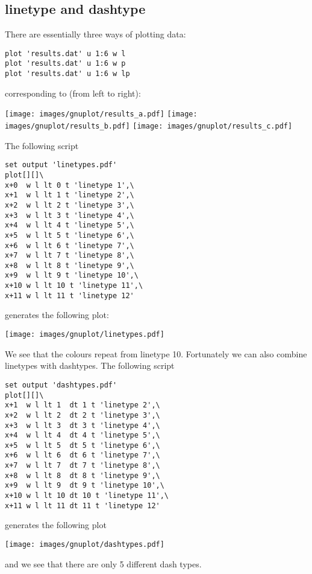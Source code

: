 \subsection*{linetype and dashtype}

There are essentially three ways of plotting data: 
\begin{verbatim}
plot 'results.dat' u 1:6 w l 
plot 'results.dat' u 1:6 w p
plot 'results.dat' u 1:6 w lp
\end{verbatim}
corresponding to (from left to right):
\begin{center}
\texttt{[image: images/gnuplot/results\_a.pdf]}
\texttt{[image: images/gnuplot/results\_b.pdf]}
\texttt{[image: images/gnuplot/results\_c.pdf]}
\end{center}

The following script
\begin{verbatim}
set output 'linetypes.pdf'
plot[][]\
x+0  w l lt 0 t 'linetype 1',\
x+1  w l lt 1 t 'linetype 2',\
x+2  w l lt 2 t 'linetype 3',\
x+3  w l lt 3 t 'linetype 4',\
x+4  w l lt 4 t 'linetype 5',\
x+5  w l lt 5 t 'linetype 6',\
x+6  w l lt 6 t 'linetype 7',\
x+7  w l lt 7 t 'linetype 8',\
x+8  w l lt 8 t 'linetype 9',\
x+9  w l lt 9 t 'linetype 10',\
x+10 w l lt 10 t 'linetype 11',\
x+11 w l lt 11 t 'linetype 12'
\end{verbatim}
generates the following plot:
\begin{center}
\texttt{[image: images/gnuplot/linetypes.pdf]}
\end{center}
We see that the colours repeat from linetype 10. 
Fortunately we can also combine linetypes with dashtypes.
The following script
\begin{verbatim}
set output 'dashtypes.pdf'
plot[][]\
x+1  w l lt 1  dt 1 t 'linetype 2',\
x+2  w l lt 2  dt 2 t 'linetype 3',\
x+3  w l lt 3  dt 3 t 'linetype 4',\
x+4  w l lt 4  dt 4 t 'linetype 5',\
x+5  w l lt 5  dt 5 t 'linetype 6',\
x+6  w l lt 6  dt 6 t 'linetype 7',\
x+7  w l lt 7  dt 7 t 'linetype 8',\
x+8  w l lt 8  dt 8 t 'linetype 9',\
x+9  w l lt 9  dt 9 t 'linetype 10',\
x+10 w l lt 10 dt 10 t 'linetype 11',\
x+11 w l lt 11 dt 11 t 'linetype 12' 
\end{verbatim}
generates the following plot
\begin{center}
\texttt{[image: images/gnuplot/dashtypes.pdf]}
\end{center}
and we see that there are only 5 different dash types. 

